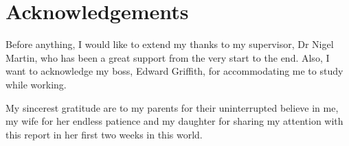 \chapter*{Acknowledgements}

Before anything, I would like to extend my thanks to my supervisor, Dr Nigel Martin, who has been a great support from the very start to the end. Also, I want to acknowledge my boss, Edward Griffith, for accommodating me to study while working.

My sincerest gratitude are to my parents for their uninterrupted believe in me, my wife for her endless patience and my daughter for sharing my attention with this report in her first two weeks in this world.